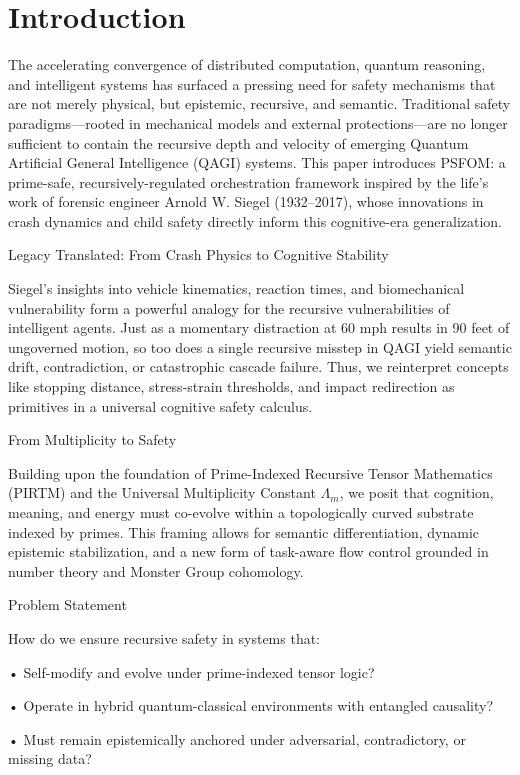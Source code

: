 \documentclass[11pt]{article}
\begin{document}
\section{Introduction}
The accelerating convergence of distributed computation, quantum reasoning, and intelligent systems has surfaced a pressing need for safety mechanisms that are not merely physical, but epistemic, recursive, and semantic. Traditional safety paradigms—rooted in mechanical models and external protections—are no longer sufficient to contain the recursive depth and velocity of emerging Quantum Artificial General Intelligence (QAGI) systems. This paper introduces PSFOM: a prime-safe, recursively-regulated orchestration framework inspired by the life’s work of forensic engineer Arnold W. Siegel (1932--2017), whose innovations in crash dynamics and child safety directly inform this cognitive-era generalization.

Legacy Translated: From Crash Physics to Cognitive Stability

Siegel’s insights into vehicle kinematics, reaction times, and biomechanical vulnerability form a powerful analogy for the recursive vulnerabilities of intelligent agents. Just as a momentary distraction at 60 mph results in 90 feet of ungoverned motion, so too does a single recursive misstep in QAGI yield semantic drift, contradiction, or catastrophic cascade failure. Thus, we reinterpret concepts like stopping distance, stress-strain thresholds, and impact redirection as primitives in a universal cognitive safety calculus.

From Multiplicity to Safety

Building upon the foundation of Prime-Indexed Recursive Tensor Mathematics (PIRTM) and the Universal Multiplicity Constant $\Lambda_m$, we posit that cognition, meaning, and energy must co-evolve within a topologically curved substrate indexed by primes. This framing allows for semantic differentiation, dynamic epistemic stabilization, and a new form of task-aware flow control grounded in number theory and Monster Group cohomology.

Problem Statement

How do we ensure recursive safety in systems that:

• Self-modify and evolve under prime-indexed tensor logic?

• Operate in hybrid quantum-classical environments with entangled causality?

• Must remain epistemically anchored under adversarial, contradictory, or missing data?
\end{document}
